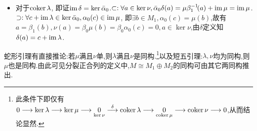 \documentclass[11pt]{article} %
\begin{document}
\begin{enumerate}
\begin{itemize}
        \item 对于$\operatorname{coker}\lambda$, 即证$\operatorname{im}\delta=\ker\bar{\alpha}_0$.$\subset: \forall a\in\ker\nu, \bar{\alpha}_0\delta(a)=\mu\beta_1^{-1}\!(a)+\operatorname{im}\mu=\operatorname{im}\mu$.$\supset: \forall c+\operatorname{im}\lambda\in \ker\bar{\alpha}_0, \alpha_0(c)\in \operatorname{im}\mu$, 即$\exists b\in M_1, \alpha_0(c)=\mu(b)$,故有$a=\beta_1(b), \nu(a)=\beta_0\mu(b)=\beta_0\alpha_0(c)=0, a\in\ker\nu$,由$\delta$定义知$\delta(a)=c+\operatorname{im}\lambda$.
    \end{itemize}
\end{enumerate}
\normalsize

蛇形引理有直接推论:若$\mu$满且$\nu$单,则$\lambda$满且$\nu$是同构.\footnote{此条件下即仅有$0\longrightarrow \ker\lambda \longrightarrow \ker\mu \longrightarrow \underset{\ker\nu}{0} \overset{\delta}{\longrightarrow} \operatorname{coker}\lambda \longrightarrow \underset{\operatorname{coker}\mu}{0} \longrightarrow \operatorname{coker}\nu \longrightarrow 0$,从而结论显然.}以及短五引理:$\lambda,\nu$均为同构,则$\mu$也是同构.由此可见分裂正合列的定义中,$M\cong M_1\oplus M_2$的同构可由其它两同构推出.
\end{document}
